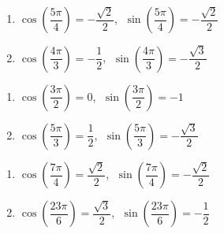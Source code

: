 \begin{multicols}{2}

\begin{enumerate}

\setcounter{enumi}{\value{HW}}

\item $\cos \left(\dfrac{5\pi}{4} \right) = -\dfrac{\sqrt{2}}{2}$, $\; \sin \left(\dfrac{5\pi}{4} \right) = -\dfrac{\sqrt{2}}{2}$

\item $\cos\left(\dfrac{4\pi}{3}\right) = -\dfrac{1}{2}$, $\; \sin \left(\dfrac{4\pi}{3}\right) = -\dfrac{\sqrt{3}}{2}$

\setcounter{HW}{\value{enumi}}

\end{enumerate}

\end{multicols}

\begin{multicols}{2}

\begin{enumerate}

\setcounter{enumi}{\value{HW}}

\item $\cos \left(\dfrac{3\pi}{2}\right) = 0$, $\; \sin \left(\dfrac{3\pi}{2}\right) = -1$

\item $\cos\left(\dfrac{5\pi}{3}\right) = \dfrac{1}{2}$, $\; \sin \left(\dfrac{5\pi}{3}\right) = -\dfrac{\sqrt{3}}{2}$

\setcounter{HW}{\value{enumi}}

\end{enumerate}

\end{multicols}

\begin{multicols}{2}

\begin{enumerate}

\setcounter{enumi}{\value{HW}}

\item $\cos \left(\dfrac{7\pi}{4} \right) = \dfrac{\sqrt{2}}{2}$, $\; \sin \left(\dfrac{7\pi}{4} \right) = -\dfrac{\sqrt{2}}{2}$

\item $\cos\left(\dfrac{23\pi}{6}\right) = \dfrac{\sqrt{3}}{2}$, $\; \sin\left(\dfrac{23\pi}{6}\right) = -\dfrac{1}{2}$

\setcounter{HW}{\value{enumi}}

\end{enumerate}

\end{multicols}

